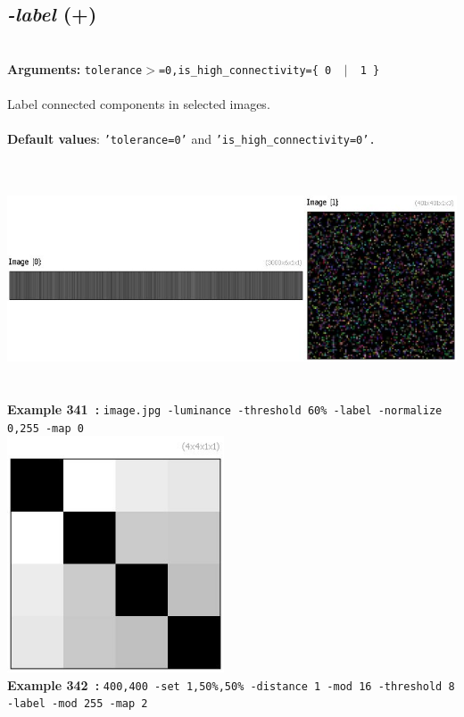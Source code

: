 \documentclass[a4paper,11pt,twoside]{book}
\begin{document}
\subsection{\emph{-label} (+)}\vspace*{-0.5em}
~\\\textbf{Arguments: } 
{\small \texttt{tolerance$>$=0,is\_high\_connectivity=\{ 0 ~$|$~ 1 \}}}\\~\\
Label connected components in selected images.
~\\~\\\textbf{Default values}: {\small \texttt{'tolerance=0'} and \texttt{'is\_high\_connectivity=0'.}}
\begin{center}\includegraphics[keepaspectratio=true,height=7cm,width=\textwidth]{img/gmic_def341.jpg}\\
{\footnotesize \textbf{Example 341~:} \texttt{image.jpg -luminance -threshold 60\% -label -normalize 0,255 -map 0}}
\\\includegraphics[keepaspectratio=true,height=7cm,width=\textwidth]{img/gmic_def342.jpg}\\
{\footnotesize \textbf{Example 342~:} \texttt{400,400 -set 1,50\%,50\% -distance 1 -mod 16 -threshold 8 -label -mod 255 -map 2}}
\end{center}
\end{document}
